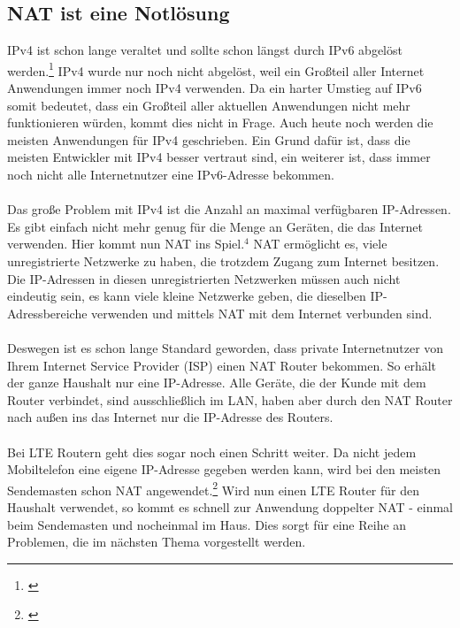 \subsection{NAT ist eine Notlösung}
IPv4 ist schon lange veraltet und sollte schon längst durch IPv6 abgelöst werden.\footnote[4]{\cite[Vgl.][]{NAT8}} IPv4 wurde nur noch nicht abgelöst, weil ein Großteil aller Internet Anwendungen immer noch IPv4 verwenden. Da ein harter Umstieg auf IPv6 somit bedeutet, dass ein Großteil aller aktuellen Anwendungen nicht mehr funktionieren würden, kommt dies nicht in Frage. Auch heute noch werden die meisten Anwendungen für IPv4 geschrieben. Ein Grund dafür ist, dass die meisten Entwickler mit IPv4 besser vertraut sind, ein weiterer ist, dass immer noch nicht alle Internetnutzer eine IPv6-Adresse bekommen.
\\\\
Das große Problem mit IPv4 ist die Anzahl an maximal verfügbaren IP-Adressen. Es gibt einfach nicht mehr genug für die Menge an Geräten, die das Internet verwenden. 
Hier kommt nun NAT ins Spiel.$^{4}$ NAT ermöglicht es, viele unregistrierte Netzwerke zu haben, die trotzdem Zugang zum Internet besitzen. Die IP-Adressen in diesen unregistrierten Netzwerken müssen auch nicht eindeutig sein, es kann viele kleine Netzwerke geben, die dieselben IP-Adressbereiche verwenden und mittels NAT mit dem Internet verbunden sind.
\\\\
Deswegen ist es schon lange Standard geworden, dass private Internetnutzer von Ihrem Internet Service Provider (ISP) einen NAT Router bekommen. So erhält der ganze Haushalt nur eine IP-Adresse. Alle Geräte, die der Kunde mit dem Router verbindet, sind ausschließlich im LAN, haben aber durch den NAT Router nach außen ins das Internet nur die IP-Adresse des Routers. 
\\\\
Bei LTE Routern geht dies sogar noch einen Schritt weiter. Da nicht jedem Mobiltelefon eine eigene IP-Adresse gegeben werden kann, wird bei den meisten Sendemasten schon NAT angewendet.\footnote[1]{\cite[Vgl.][]{NAT9}} Wird nun einen LTE Router für den Haushalt verwendet, so kommt es schnell zur Anwendung doppelter NAT - einmal beim Sendemasten und nocheinmal im Haus. Dies sorgt für eine Reihe an Problemen, die im nächsten Thema vorgestellt werden. 


